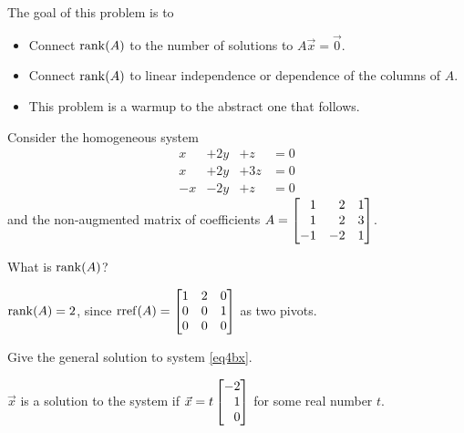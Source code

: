 \documentclass{workbook}
\begin{document}
\begin{slide}

	\begin{bookonly}\end{bookonly}
	\question
	\begin{annotation}
		\begin{goals}

			The goal of this problem is to
			\begin{itemize}
				\item Connect $\operatorname{rank}(A)$ to the number of solutions to $A\vec x=\vec 0$.
				\item Connect $\operatorname{rank}(A)$ to linear independence or dependence of the columns of $A$.
			\end{itemize}
		\end{goals}

		\begin{notes}
			\begin{itemize}
				\item This problem is a warmup to the abstract one that follows.
			\end{itemize}
		\end{notes}
	\end{annotation}
	Consider the homogeneous system
		\begin{equation}\label{eq4bx}
			\begin{array}{llll}
				x&+2y&+z &= 0\\
				x&+2y&+3z &= 0\\
				-x&-2y&+z &= 0
			\end{array}
		\end{equation}
	and the non-augmented matrix of coefficients $A=\mat{1&2&1\\1&2&3\\-1&-2&1}$.
	\begin{parts}
		\item What is $\operatorname{rank}(A)$?
			\begin{solution}
				$\operatorname{rank}(A)=2$, since $\rref(A)=\mat{1&2&0\\0&0&1\\0&0&0}$ as two pivots.
			\end{solution}
		\item Give the general solution to system \eqref{eq4bx}.
			\begin{solution}
				$\vec x$ is a solution to the system if
				$\vec x=t\mat{-2\\1\\0}$ for some real number $t$.


\end{solution}
\end{parts}
\end{slide}
\end{document}
